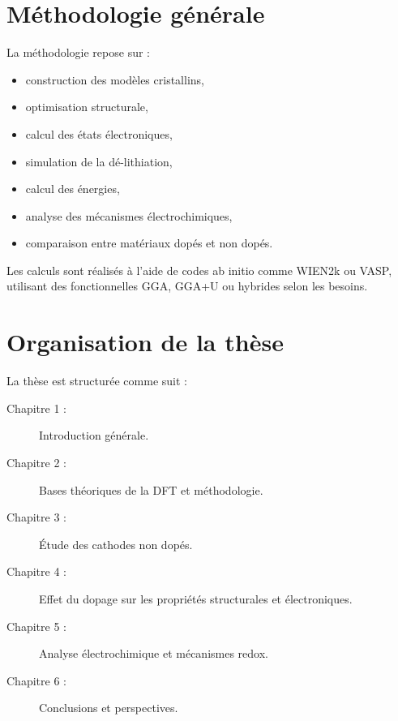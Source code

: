 \documentclass[12pt,a4paper]{report}
\begin{document}
\section{Méthodologie générale}

La méthodologie repose sur :
\begin{itemize}
    \item construction des modèles cristallins,
    \item optimisation structurale,
    \item calcul des états électroniques,
    \item simulation de la dé-lithiation,
    \item calcul des énergies,
    \item analyse des mécanismes électrochimiques,
    \item comparaison entre matériaux dopés et non dopés.
\end{itemize}

Les calculs sont réalisés à l’aide de codes ab initio comme WIEN2k ou VASP,
utilisant des fonctionnelles GGA, GGA+U ou hybrides selon les besoins.

\section{Organisation de la thèse}

La thèse est structurée comme suit :

\begin{description}
    \item[Chapitre 1 :] Introduction générale.
    \item[Chapitre 2 :] Bases théoriques de la DFT et méthodologie.
    \item[Chapitre 3 :] Étude des cathodes non dopés.
    \item[Chapitre 4 :] Effet du dopage sur les propriétés structurales et électroniques.
    \item[Chapitre 5 :] Analyse électrochimique et mécanismes redox.
    \item[Chapitre 6 :] Conclusions et perspectives.
\end{description}
\end{document}
